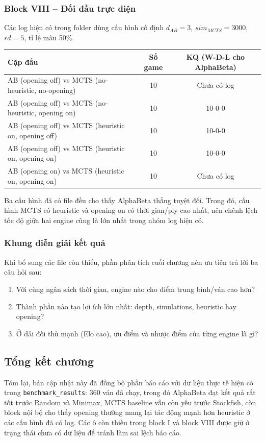 \subsubsection{Block VIII -- Đối đầu trực diện}

Các log hiện có trong folder dùng cấu hình cố định \(d_{AB}=3\), \(sim_{MCTS}=3000\), \(rd=5\), tỉ lệ màu 50\%.

\begin{center}
\begin{tabular}{|p{8.6cm}|c|c|}
\hline
\textbf{Cặp đấu} & \textbf{Số game} & \textbf{KQ (W-D-L cho AlphaBeta)} \\
\hline
AB (opening off) vs MCTS (no-heuristic, no-opening) & 10 & Chưa có log \\
\hline
AB (opening off) vs MCTS (no-heuristic, opening on) & 10 & 10-0-0 \\
\hline
AB (opening off) vs MCTS (heuristic on, opening off) & 10 & 10-0-0 \\
\hline
AB (opening off) vs MCTS (heuristic on, opening on) & 10 & 10-0-0 \\
\hline
AB (opening on) vs MCTS (heuristic on, opening on) & 10 & Chưa có log \\
\hline
\end{tabular}
\end{center}

\noindent
Ba cấu hình đã có file đều cho thấy AlphaBeta thắng tuyệt đối. Trong đó, cấu hình MCTS có heuristic và opening on có thời gian/ply cao nhất, nên chênh lệch tốc độ giữa hai engine cũng là lớn nhất trong nhóm log hiện có.

\subsubsection{Khung diễn giải kết quả}

Khi bổ sung các file còn thiếu, phần phân tích cuối chương nên ưu tiên trả lời ba câu hỏi sau:
\begin{enumerate}
    \item Với cùng ngân sách thời gian, engine nào cho điểm trung bình/ván cao hơn?
    \item Thành phần nào tạo lợi ích lớn nhất: depth, simulations, heuristic hay opening?
    \item Ở dải đối thủ mạnh (Elo cao), ưu điểm và nhược điểm của từng engine là gì?
\end{enumerate}

\subsection{Tổng kết chương}

Tóm lại, bản cập nhật này đã đồng bộ phần báo cáo với dữ liệu thực tế hiện có trong \texttt{benchmark\_results}: 360 ván đã chạy, trong đó AlphaBeta đạt kết quả rất tốt trước Random và Minimax, MCTS baseline vẫn còn yếu trước Stockfish, còn block nội bộ cho thấy opening thường mang lại tác động mạnh hơn heuristic ở các cấu hình đã có log. Các ô còn thiếu trong block I và block VIII được giữ ở trạng thái chưa có dữ liệu để tránh làm sai lệch báo cáo.
